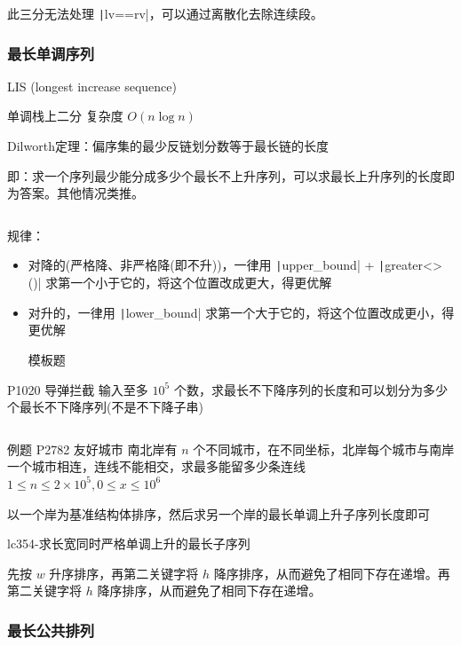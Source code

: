 \documentclass[twocolumn,10pt]{ctexart}
\begin{document}
\inputminted{cpp}{code/ext_066.cpp}

此三分无法处理 \texttt|lv==rv|，可以通过离散化去除连续段。

\subsubsection{最长单调序列}

LIS (longest increase sequence)

单调栈上二分 复杂度 $O(n\log n)$

Dilworth定理：偏序集的最少反链划分数等于最长链的长度

即：求一个序列最少能分成多少个最长不上升序列，可以求最长上升序列的长度即为答案。其他情况类推。

\inputminted{cpp}{code/ext_067.cpp}

规律：

\begin{itemize}
\item 对降的(严格降、非严格降(即不升))，一律用 \texttt|upper_bound| + \texttt|greater<>()| 求第一个小于它的，将这个位置改成更大，得更优解
\item 对升的，一律用 \texttt|lower_bound| 求第一个大于它的，将这个位置改成更小，得更优解

模板题
\end{itemize}

\begin{notebox}
P1020 导弹拦截  输入至多 $10^5$ 个数，求最长不下降序列的长度和可以划分为多少个最长不下降序列(不是不下降子串)
\end{notebox}

\inputminted{cpp}{code/p1020_LIS.cpp}

\begin{notebox}
例题 P2782 友好城市 南北岸有 $n$ 个不同城市，在不同坐标，北岸每个城市与南岸一个城市相连，连线不能相交，求最多能留多少条连线 $1\le n\le2\times10^5,\allowbreak{}0\le x\le10^6$
\end{notebox}

以一个岸为基准结构体排序，然后求另一个岸的最长单调上升子序列长度即可

\begin{notebox}
lc354-求长宽同时严格单调上升的最长子序列
\end{notebox}

先按 $w$ 升序排序，再第二关键字将 $h$ 降序排序，从而避免了相同下存在递增。再第二关键字将 $h$ 降序排序，从而避免了相同下存在递增。

\subsubsection{最长公共排列}
\end{document}
